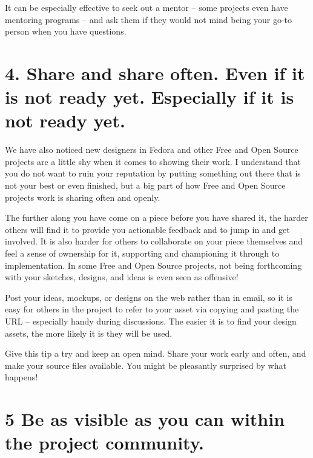 It can be especially effective to seek out a mentor -- some projects even have
mentoring programs -- and ask them if they would not mind being your go-to person when you have questions. 

\section*{4. Share and share often. Even if it is not ready yet. Especially if it
is not ready yet.}

We have also noticed new designers in Fedora and other Free and Open Source projects
are a little shy when it comes to showing their work. I understand that you
do not want to ruin your reputation by putting something out there that is not
your best or even finished, but a big part of how Free and Open Source projects
work is sharing often and openly. 

The further along you have come on a piece before you have shared it, the harder
others will find it to provide you actionable feedback and to jump in and get
involved. It is also harder for others to collaborate on your piece themselves
and feel a sense of ownership for it, supporting and championing it through to
implementation. In some Free and Open Source projects, not being forthcoming with
your sketches, designs, and ideas is even seen as offensive! 

Post your ideas, mockups, or designs on the web rather than in email, so it is
easy for others in the project to refer to your asset via copying and pasting the
URL -- especially handy during discussions. The easier it is to find your design
assets, the more likely it is they will be used. 

Give this tip a try and keep an open mind. Share your work early and often, and
make your source files available. You might be pleasantly surprised by what
happens!

\section*{5 Be as visible as you can within the project community.}

